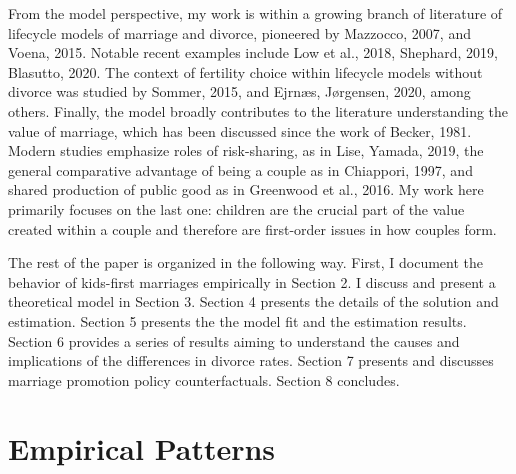 \documentclass[12pt,letter]{article}
\begin{document}
From the model perspective, my work is within a growing branch of literature of lifecycle models of marriage and divorce, pioneered by Mazzocco, 2007\nocite{mazzocco2007household}, and Voena, 2015\nocite{voena2015yours}. Notable recent examples include Low et al., 2018\nocite{low2018marriage}, Shephard, 2019\nocite{shephard2019marriage}, Blasutto, 2020\nocite{blasutto2020cohabitation}. The context of fertility choice within lifecycle models without divorce was studied by Sommer, 2015\nocite{sommer2016fertility}, and Ejrnæs, Jørgensen, 2020\nocite{ejrnaes2020family}, among others. Finally, the model broadly contributes to the literature understanding the value of marriage, which has been discussed since the work of Becker, 1981\nocite{becker1981altruism}. Modern studies emphasize roles of risk-sharing, as in Lise, Yamada, 2019\nocite{lise2019household}, the general comparative advantage of being a couple as in Chiappori, 1997\nocite{chiappori1997introducing}, and shared production of public good as in Greenwood et al., 2016\nocite{greenwood2016technology}. My work here primarily focuses on the last one: children are the crucial part of the value created within a couple and therefore are first-order issues in how couples form.

The rest of the paper is organized in the following way. First, I document the behavior of kids-first marriages empirically in Section 2. I discuss and present a theoretical model in Section 3. Section 4 presents the details of the solution and estimation. Section 5 presents the the model fit and the estimation results. Section 6 provides a series of results aiming to understand the causes and implications of the differences in divorce rates. Section 7 presents and discusses marriage promotion policy counterfactuals. Section 8 concludes.

\section{Empirical Patterns\label{empirical-section}}
\end{document}
